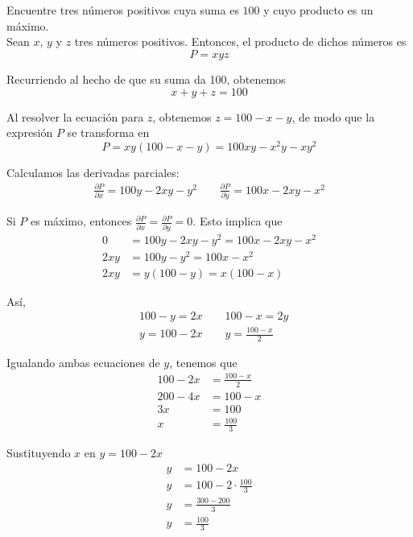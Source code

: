\documentclass[12pt]{article}
\begin{document}
\section{}

Encuentre tres números positivos cuya suma es $100$ y cuyo producto es un máximo. \\

Sean $x$, $y$ y $z$ tres números positivos. Entonces, el producto de dichos números es $$P=xyz$$

Recurriendo al hecho de que su suma da 100, obtenemos $$x+y+z=100$$

Al resolver la ecuación para $z$, obtenemos $z=100-x-y$, de modo que la expresión $P$ se transforma en $$P=xy(100-x-y)=100xy-x^2y-xy^2$$

Calculamos las derivadas parciales:
\begin{align*}
  \frac{\partial P}{\partial x} = 100y - 2xy - y^2
  \qquad
  \frac{\partial P}{\partial y} = 100x - 2xy - x^2
\end{align*}

Si $P$ es máximo, entonces $\frac{\partial P}{\partial x} = \frac{\partial P}{\partial y} = 0$. Esto implica que
\begin{align*}
  0
  &= 100y - 2xy - y^2
  = 100x - 2xy - x^2 \\
  2xy
  &= 100y - y^2
  = 100x - x^2 \\
  2xy
  &= y(100-y)
  = x(100-x)
\end{align*}

Así,
\begin{align*}
  & 100-y = 2x \qquad 100-x=2y \\
  & y = 100 - 2x \qquad y =\frac{100-x}{2}
\end{align*}

Igualando ambas ecuaciones de $y$, tenemos que
\begin{align*}
  100 - 2x
  &=\frac{100-x}{2} \\
  200-4x&=100-x\\
  3x &= 100 \\
  x &= \frac{100}{3}
\end{align*}

Sustituyendo $x$ en $y=100-2x$
\begin{align*}
  y
  &=100-2x \\
  y&= 100 - 2\cdot \frac{100}{3} \\
  y&= \frac{300-200}{3} \\
  y&= \frac{100}{3}
\end{align*}
\end{document}
